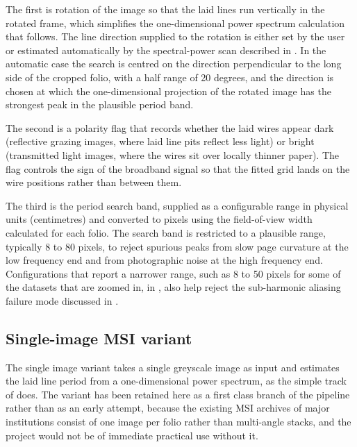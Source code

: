 The first is rotation of the image so that the laid lines run
vertically in the rotated frame, which simplifies the
one-dimensional power spectrum calculation that follows. The
line direction supplied to the rotation is either set by the user
or estimated automatically by the spectral-power scan described
in . In the automatic case the
search is centred on the direction perpendicular to the long side
of the cropped folio, with a half range of 20 degrees, and the
direction is chosen at which the one-dimensional projection of the rotated
image has the strongest peak in the plausible period band.

The second is a polarity flag that records whether the laid wires
appear dark (reflective grazing images, where laid line pits reflect less light) or bright (transmitted light
images, where the wires sit over locally thinner paper). The flag
controls the sign of the broadband signal so that the fitted grid
lands on the wire positions rather than between them.

The third is the period search band, supplied as a configurable
range in physical units (centimetres) and converted to pixels using
the field-of-view width calculated for each folio. The search band is restricted to a
plausible range, typically 8 to 80 pixels, to reject spurious peaks from
slow page curvature at the low frequency end and from photographic
noise at the high frequency end. Configurations that report a
narrower range, such as 8 to 50 pixels for some
of the datasets that are zoomed in, in , also
help reject the sub-harmonic aliasing failure mode discussed in
.

\subsection{Single-image MSI variant}
\label{sec:multiphi:single}

The single image variant takes a single greyscale image as input
and estimates the laid line period from a one-dimensional power
spectrum, as the simple track of 
does. The variant has been retained here as a first class branch
of the pipeline rather than as an early attempt, because the
existing MSI archives of major institutions consist of one image
per folio rather than multi-angle stacks, and the project would
not be of immediate practical use without it.

